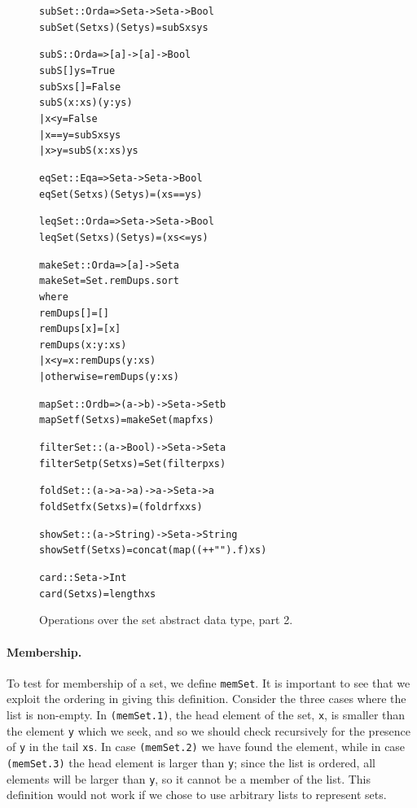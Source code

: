 \begin{figure}
\begin{alltt}
subSet :: Ord a => Set a -> Set a -> Bool
subSet (Set xs) (Set ys) = subS xs ys

subS :: Ord a => [a] -> [a] -> Bool
subS [] ys      = True
subS xs []      = False
subS (x:xs) (y:ys) 
  | x<y         = False
  | x==y        = subS xs ys
  | x>y         = subS (x:xs) ys

eqSet :: Eq a => Set a -> Set a -> Bool
eqSet (Set xs) (Set ys) = (xs == ys)

leqSet :: Ord a => Set a -> Set a -> Bool
leqSet (Set xs) (Set ys) = (xs <= ys)
	
makeSet :: Ord a => [a] -> Set a
makeSet = Set . remDups . sort
          where
          remDups []     = []
          remDups [x]    = [x]
          remDups (x:y:xs) 
            | x < y      = x : remDups (y:xs)
            | otherwise  = remDups (y:xs)

mapSet :: Ord b => (a -> b) -> Set a -> Set b
mapSet f (Set xs) = makeSet (map f xs)

filterSet :: (a -> Bool) -> Set a -> Set a
filterSet p (Set xs) = Set (filter p xs)

foldSet :: (a -> a -> a) -> a -> Set a -> a
foldSet f x (Set xs) = (foldr f x xs)

showSet :: (a->String) -> Set a -> String
showSet f (Set xs) = concat (map ((++"") . f) xs)

card :: Set a -> Int
card (Set xs) = length xs
\end{alltt}
\caption{Operations over the set abstract data type, part 2.}
\label{setDefs2}
\end{figure}

\paragraph{Membership.}
To test for membership of a set, we define \texttt{memSet}. It is important to
see that we exploit the ordering in giving this definition.
Consider the three cases where the list is non-empty. In \texttt{(memSet.1)}, the head
element of the set, \texttt{x}, is smaller than the element \texttt{y} which we seek, and so we
should check recursively for the presence of \texttt{y} in the tail \texttt{xs}. 
In case \texttt{(memSet.2)} we have found
the element, while in case \texttt{(memSet.3)} the head element is larger than
\texttt{y}; since the list is ordered, all elements will be larger than
\texttt{y}, so it cannot be a member of the list. This definition would 
not work if we chose to use arbitrary lists to represent sets.


